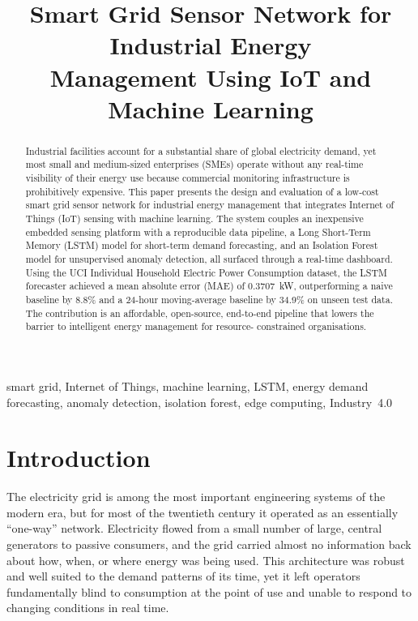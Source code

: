 \documentclass[conference]{IEEEtran}
\begin{document}
\title{Smart Grid Sensor Network for Industrial Energy\\
Management Using IoT and Machine Learning}

\author{
}

\maketitle
\begin{abstract}
Industrial facilities account for a substantial share of global electricity
demand, yet most small and medium-sized enterprises (SMEs) operate without any
real-time visibility of their energy use because commercial monitoring
infrastructure is prohibitively expensive. This paper presents the design and
evaluation of a low-cost smart grid sensor network for industrial energy
management that integrates Internet of Things (IoT) sensing with machine
learning. The system couples an inexpensive embedded sensing platform with a
reproducible data pipeline, a Long Short-Term Memory (LSTM) model for
short-term demand forecasting, and an Isolation Forest model for unsupervised
anomaly detection, all surfaced through a real-time dashboard. Using the UCI
Individual Household Electric Power Consumption dataset, the LSTM forecaster
achieved a mean absolute error (MAE) of 0.3707~kW, outperforming a naive
baseline by 8.8\% and a 24-hour moving-average baseline by 34.9\% on unseen
test data. The contribution is an affordable, open-source, end-to-end pipeline
that lowers the barrier to intelligent energy management for resource-
constrained organisations.
\end{abstract}

\begin{IEEEkeywords}
smart grid, Internet of Things, machine learning, LSTM, energy demand
forecasting, anomaly detection, isolation forest, edge computing, Industry~4.0
\end{IEEEkeywords}

\section{Introduction}
The electricity grid is among the most important engineering systems of the
modern era, but for most of the twentieth century it operated as an essentially
``one-way'' network. Electricity flowed from a small number of large, central
generators to passive consumers, and the grid carried almost no information back
about how, when, or where energy was being used. This architecture was robust
and well suited to the demand patterns of its time, yet it left operators
fundamentally blind to consumption at the point of use and unable to respond to
changing conditions in real time.
\end{document}
